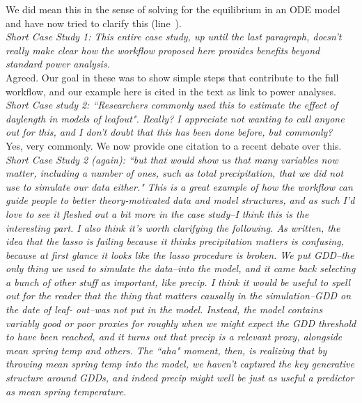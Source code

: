 \documentclass[11pt,a4paper]{article}
\newcommand{\lr}[1]{line~\lineref{#1}}
\begin{document}
We did mean this in the sense of solving for the equilibrium in an ODE model and have now tried to clarify this (\lr{ode}).\\

\emph{Short Case Study 1: This entire case study, up until the last paragraph, doesn't really make clear how the workflow proposed here provides benefits beyond standard power analysis.}\\

Agreed. Our goal in these was to show simple steps that contribute to the full workflow, and our example here is cited in the text as link to power analyses.\\

\emph{Short Case study 2: ``Researchers commonly used this to estimate the effect of daylength in models of leafout". Really? I appreciate not wanting to call anyone out for this, and I don't doubt that this has been done before, but
commonly?}\\

Yes, very commonly. We now provide one citation to a recent debate over this.\\

\emph{Short Case Study 2 (again): ``but that would show us that many variables now matter, including a number of ones, such as total precipitation, that we did not use to simulate our data either." This is a great example of how the workflow can guide people to better theory-motivated data and model structures, and as such I'd love to see it fleshed out a bit more in the case study--I think this is the interesting part. I also think it's worth clarifying the following. As written, the idea that the lasso is failing because it thinks precipitation matters is confusing, because at first glance it looks like the lasso procedure is broken. We put GDD--the only thing we used to simulate the data--into the model, and it came back selecting a bunch of other stuff as important, like precip. I think it would be useful to spell out for the reader that the thing that matters causally in the simulation--GDD on the date of leaf- out--was not put in the model. Instead, the model contains variably good or poor proxies for roughly when we might expect the GDD threshold to have been reached, and it turns out that precip is a relevant proxy, alongside mean spring temp and others. The ``aha" moment, then, is realizing that by throwing mean spring temp into the model, we haven't captured the key generative structure around GDDs, and indeed precip might well be just as useful a predictor as mean spring temperature.}\\
\end{document}
